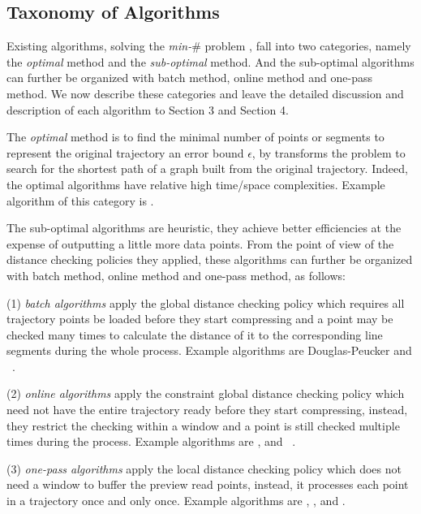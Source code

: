 \subsection {Taxonomy of Algorithms}
\label{subsec-taxonomy}

Existing \lsa algorithms, solving the \emph{min-$\#$} problem \cite{Chan:Optimal, Imai:Optimal,Pavlidis:Segment}, fall into two categories, namely the \textit{optimal} method and the \textit{sub-optimal} method. And the sub-optimal algorithms can further be organized with batch method, online method and one-pass method.
We now describe these categories and leave the detailed discussion and description of each algorithm to Section 3 and Section 4.

The \textit{optimal} method is to find the minimal number of points or segments to represent the original trajectory \wrt an error bound $\epsilon$, by transforms the problem to search for the shortest path of a graph built from the original trajectory. Indeed, the optimal \lsa algorithms have relative high time/space complexities.
Example algorithm of this category is \opt \cite{Imai:Optimal,Chan:Optimal}. %


The sub-optimal algorithms are heuristic, they achieve better efficiencies at the expense of outputting a little more data points.
From the point of view of the distance checking policies they applied, these algorithms can further be organized with
batch method, online method and one-pass method, as follows:

\ni (1) \textit{batch algorithms} apply the global distance checking policy which requires all trajectory points be loaded before they start compressing and a point may be checked many times to calculate the distance of it to the corresponding line segments during the whole process. Example algorithms are Douglas-Peucker\cite{Douglas:Peucker,Meratnia:Spatiotemporal} and \pavlidis~\cite{Pavlidis:Segment}.

\ni (2) \textit{online algorithms} apply the constraint global distance checking policy which need not have the entire trajectory ready before they start compressing, instead, they restrict the checking within a window and a point is still checked multiple times during the process. Example algorithms are \opwa \cite{Meratnia:Spatiotemporal}, \bqsa\cite{Liu:BQS} and \squishe~\cite{Muckell:SQUISH}.

\ni (3) \textit{one-pass algorithms} apply the local distance checking policy which does not need a window to buffer the preview read points, instead, it processes each point in a trajectory once and only once. Example algorithms are \operb\cite{Lin:Operb}, \siped \cite{Williams:Longest,Sklansky:Cone,Dunham:Cone, Zhao:Sleeve}, \cised \cite{Lin:Cised} and \interval \cite{Ke:Interval}.

